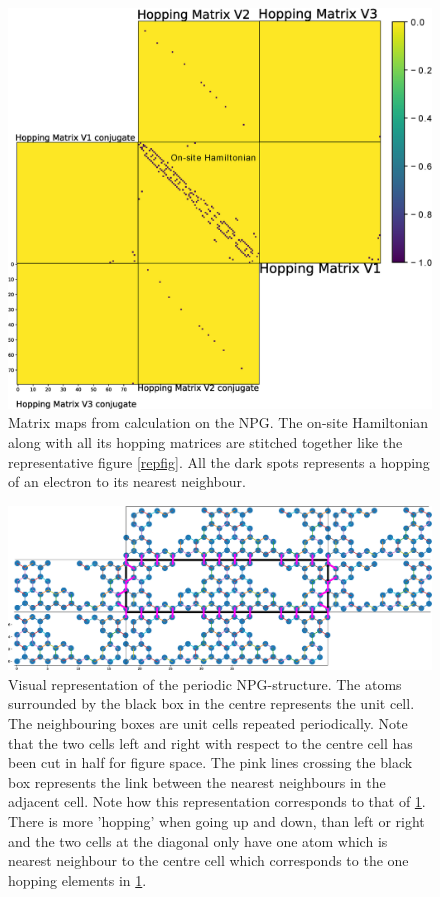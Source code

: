 \begin{figure}[H]
    \centering
    \includegraphics[width=\textwidth]{Figures/Matrixmap.eps}
    \caption{Matrix maps from calculation on the NPG. The on-site Hamiltonian along with all its hopping matrices are stitched together like the representative figure \cref{repfig}. All the dark spots represents a hopping of an electron to its nearest neighbour.}
    \label{matrixmap}
\end{figure}
\begin{figure}[H]
    \centering
    \includegraphics[width=\textwidth]{Figures/representativestructure2.eps}
    \caption{Visual representation of the periodic NPG-structure. The atoms surrounded by the black box in the centre represents the unit cell. The neighbouring boxes are unit cells repeated periodically. Note that the two cells left and right with respect to the centre cell has been cut in half for figure space. The pink lines crossing the black box represents the link between the nearest neighbours in the adjacent cell. Note how this representation corresponds to that of \cref{matrixmap}. There is more 'hopping' when going up and down, than left or right and the two cells at the diagonal only have one atom which is nearest neighbour to the centre cell which corresponds to the one hopping elements in \cref{matrixmap}.}
    \label{atomrepfig}
\end{figure}
